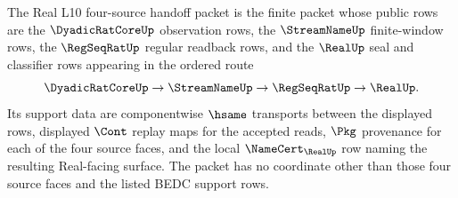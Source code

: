 \begin{definition}
\label{def:real-l10-four-source-handoff-packet}
The Real L10 four-source handoff packet is the finite packet whose public rows are the $\DyadicRatCoreUp$ observation rows, the $\StreamNameUp$ finite-window rows, the $\RegSeqRatUp$ regular readback rows, and the $\RealUp$ seal and classifier rows appearing in the ordered route
$$
\DyadicRatCoreUp \to \StreamNameUp \to \RegSeqRatUp \to \RealUp .
$$
Its support data are componentwise $\hsame$ transports between the displayed rows, displayed $\Cont$ replay maps for the accepted reads, $\Pkg$ provenance for each of the four source faces, and the local $\NameCert_{\RealUp}$ row naming the resulting Real-facing surface. The packet has no coordinate other than those four source faces and the listed BEDC support rows.
\end{definition}


